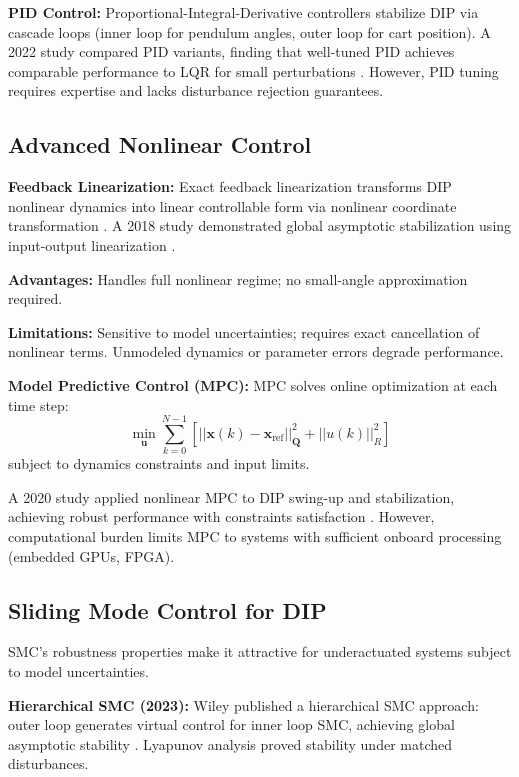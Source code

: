 \textbf{PID Control:} Proportional-Integral-Derivative controllers stabilize DIP via cascade loops (inner loop for pendulum angles, outer loop for cart position). A 2022 study compared PID variants, finding that well-tuned PID achieves comparable performance to LQR for small perturbations \cite{pid2022dip}. However, PID tuning requires expertise and lacks disturbance rejection guarantees.

\subsection{Advanced Nonlinear Control}

\textbf{Feedback Linearization:} Exact feedback linearization transforms DIP nonlinear dynamics into linear controllable form via nonlinear coordinate transformation \cite{isidori1995nonlinear}. A 2018 study demonstrated global asymptotic stabilization using input-output linearization \cite{feedback2018dip}.

\textbf{Advantages:} Handles full nonlinear regime; no small-angle approximation required.

\textbf{Limitations:} Sensitive to model uncertainties; requires exact cancellation of nonlinear terms. Unmodeled dynamics or parameter errors degrade performance.

\textbf{Model Predictive Control (MPC):} MPC solves online optimization at each time step:
\begin{equation}
\min_{\mathbf{u}} \sum_{k=0}^{N-1} [||\mathbf{x}(k) - \mathbf{x}_{\text{ref}}||_{\mathbf{Q}}^2 + ||u(k)||_R^2]
\label{eq:mpc_cost}
\end{equation}
subject to dynamics constraints and input limits.

A 2020 study applied nonlinear MPC to DIP swing-up and stabilization, achieving robust performance with constraints satisfaction \cite{mpc2020dip}. However, computational burden limits MPC to systems with sufficient onboard processing (embedded GPUs, FPGA).

\subsection{Sliding Mode Control for DIP}

SMC's robustness properties make it attractive for underactuated systems subject to model uncertainties.

\textbf{Hierarchical SMC (2023):} Wiley published a hierarchical SMC approach: outer loop generates virtual control for inner loop SMC, achieving global asymptotic stability \cite{wiley2023hierarchical}. Lyapunov analysis proved stability under matched disturbances.


